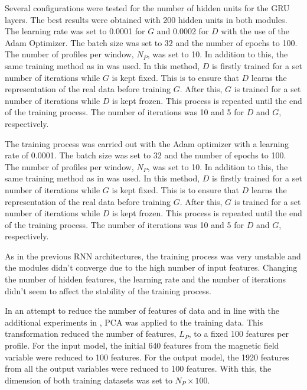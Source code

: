 Several configurations were tested for the number of hidden units for the GRU layers. The best results were obtained with 200 hidden units in both modules. The learning rate was set to 0.0001 for $G$ and 0.0002 for $D$ with the use of the Adam Optimizer. The batch size was set to 32 and the number of epochs to 100. The number of profiles per window, $N_P$, was set to 10. In addition to this, the same training method as in \cite{li.etal_MADGANMultivariateAnomaly_2019} was used. In this method, $D$ is firstly trained for a set number of iterations while $G$ is kept fixed. This is to ensure that $D$ learns the representation of the real data before training $G$. After this, $G$ is trained for a set number of iterations while $D$ is kept frozen. This process is repeated until the end of the training process. The number of iterations was 10 and 5 for $D$ and $G$, respectively.

The training process was carried out with the Adam optimizer with a learning rate of 0.0001. The batch size was set to 32 and the number of epochs to 100. The number of profiles per window, $N_P$, was set to 10. In addition to this, the same training method as in \cite{li.etal_MADGANMultivariateAnomaly_2019} was used. In this method, $D$ is firstly trained for a set number of iterations while $G$ is kept fixed. This is to ensure that $D$ learns the representation of the real data before training $G$. After this, $G$ is trained for a set number of iterations while $D$ is kept frozen. This process is repeated until the end of the training process. The number of iterations was 10 and 5 for $D$ and $G$, respectively.

As in the previous RNN architectures, the training process was very unstable and the modules didn't converge due to the high number of input features. Changing the number of hidden features, the learning rate and the number of iterations didn't seem to affect the stability of the training process.

In an attempt to reduce the number of features of data and in line with the additional experiments in \cite{li.etal_MADGANMultivariateAnomaly_2019}, PCA was applied to the training data. This transformation reduced the number of features, $L_P$, to a fixed 100 features per profile. For the input model, the initial 640 features from the magnetic field variable were reduced to 100 features. For the output model, the 1920 features from all the output variables were reduced to 100 features. With this, the dimension of both training datasets was set to $N_P \times 100$.

